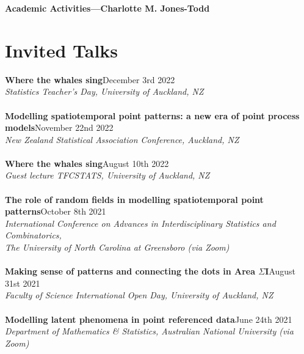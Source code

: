 \documentclass[10pt,letter]{article}
\begin{document}
\LARGE{\textbf{Academic Activities---Charlotte M. Jones-Todd}}

\normalsize

\noindent\makebox[\linewidth]{\rule{\paperwidth}{0.4pt}}

\section*{Invited Talks}
\vspace{1mm}
{\textbf{Where the whales sing}}\hfill December 3rd 2022\\
       {\sl Statistics Teacher's Day, University of Auckland, NZ}\\
       \hdashrule[0.5ex]{4cm}{1pt}{1pt}\\
{\textbf{Modelling spatiotemporal point patterns: a new era of point process \\ models}}\hfill November 22nd 2022\\
       {\sl New Zealand Statistical Association Conference, Auckland, NZ}\\
       \hdashrule[0.5ex]{4cm}{1pt}{1pt}\\
{\textbf{Where the whales sing}}\hfill August 10th 2022\\
       {\sl Guest lecture TFCSTATS, University of Auckland, NZ}\\
       \hdashrule[0.5ex]{4cm}{1pt}{1pt}\\
{\textbf{The role of random fields in modelling spatiotemporal point patterns}}\hfill October 8th 2021\\
       {\sl International Conference on Advances in Interdisciplinary Statistics and Combinatorics,\\ The University of North Carolina at Greensboro (via Zoom)}\\
       \hdashrule[0.5ex]{4cm}{1pt}{1pt}\\
 {\textbf{Making sense of patterns and connecting the dots in Area $\Sigma$I}}\hfill August 31st 2021\\
       {\sl Faculty of Science International Open Day, University of Auckland, NZ}\\
       \hdashrule[0.5ex]{4cm}{1pt}{1pt}\\
       {\textbf{Modelling latent phenomena in point referenced data}}\hfill June 24th 2021\\
       {\sl Department of Mathematics \& Statistics, Australian National University (via Zoom)}\\
\end{document}
